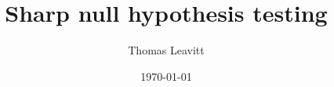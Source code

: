 \documentclass[table, xcolor={dvipsnames}, 9pt]{beamer}
\title[]{Sharp null hypothesis testing} %
\author{Thomas Leavitt} %
\institute[] %
{
\medskip
\textit{} %
}
\date{\today} %
\theoremstyle{newstyle}
\begin{document}
\begin{frame}
\titlepage %
\end{frame}


\end{document}
